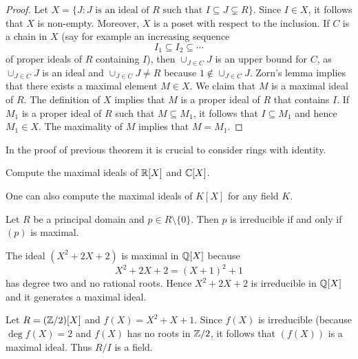 \begin{proof}
	Let $X=\{J:J\text{ is an ideal of $R$ such that }I\subseteq J\subsetneq R\}$.
	Since $I\in X$, it follows that $X$ is non-empty. Moreover, $X$ is a poset
	with respect to the inclusion. If $C$ is a chain in $X$ (say for example
	an increasing sequence
	\[
	I_1\subseteq I_2\subseteq\cdots
	\]
	of proper ideals of $R$ containing $I$), then 
	$\cup_{J\in C}J$ is an upper bound for $C$, as $\cup_{J\in C}J$ is an ideal and
	$\cup_{J\in C}J\ne R$ because $1\not\in\cup_{J\in C}J$. 	Zorn's lemma implies that
	there exists a maximal element $M\in X$. We claim that $M$ is a maximal ideal of $R$. The definition
	of $X$ implies that $M$ is a proper ideal of $R$ that contains $I$. If $M_1$ is a proper ideal of $R$
	such that $M\subseteq M_1$, it follows that $I\subseteq M_1$ and hence $M_1\in X$. The maximality
	of $M$ implies that $M=M_1$.  
\end{proof}

In the proof of previous theorem it is crucial to consider rings with 
identity. 

\begin{exercise}
	Compute the maximal ideals of $\mathbb{R}[X]$ and $\mathbb{C}[X]$. 	
\end{exercise}

One can also compute the maximal ideals of $K[X]$ for any field $K$. 

\begin{exercise}
	Let $R$ be a principal domain and $p\in R\setminus\{0\}$. Then $p$ is irreducible 
	if and only if $(p)$ is maximal.	
\end{exercise}

\begin{example}
	The ideal $(X^2+2X+2)$ is maximal in $\mathbb{Q}[X]$ because
	\[
	X^2+2X+2=(X+1)^2+1
	\]
	has degree two and no rational roots. 
	Hence $X^2+2X+2$ is irreducible in $\mathbb{Q}[X]$ and it generates 
	a maximal ideal. 	
\end{example}


\begin{example}
	Let $R=(\mathbb{Z}/2)[X]$ and $f(X)=X^2+X+1$. Since $f(X)$ is irreducible (because $\deg f(X)=2$ and
	$f(X)$ has no roots in $\mathbb{Z}/2$, it follows that $(f(X))$ is a maximal ideal. 
	Thus $R/I$ is a field. 
\end{example}

